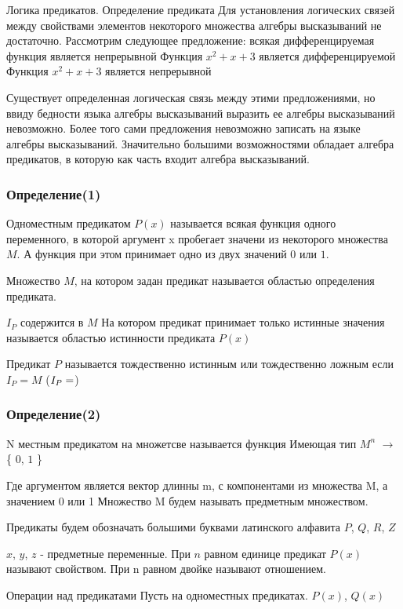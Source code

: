 Логика предикатов.
Определение предиката
Для установления логических связей между свойствами элементов некоторого множества алгебры высказываний не достаточно.
Рассмотрим следующее предложение: всякая дифференцируемая функция является непрерывной
Функция $x^2 + x + 3$ является дифференцируемой
Функция $x^2 +x + 3$ является непрерывной

Существует определенная логическая связь между этими предложениями, но ввиду бедности языка алгебры высказываний выразить ее алгебры высказываний невозможно. Более того сами предложения невозможно записать на языке алгебры высказываний. Значительно большими возможностями обладает алгебра предикатов, в которую как часть входит алгебра высказываний.

\subsubsection{Определение(1)}
Одноместным предикатом $P(x)$ называется всякая функция одного переменного, в которой аргумент x пробегает значени из некоторого множества $M$. А функция при этом принимает одно из двух значений $0$ или $1$.

Множество $M$, на котором задан предикат называется областью определения предиката.

$I_P$ содержится в $M$
На котором предикат принимает только истинные значения называется областью истинности предиката $P(x)$

Предикат $P$ называется тождественно истинным или тождественно ложным если $I_P = M$ ($I_P=\empty$)

\subsubsection{Определение(2)}

N местным предикатом на множетсве называется функция
Имеющая тип $M^n$ $\rightarrow$ \{ $0$, $1$ \}

Где аргументом является вектор длинны m, с компонентами из множества M, а значением 0 или 1
Множество M будем называть предметным множеством.

Предикаты будем обозначать большими буквами латинского алфавита
$P$, $Q$, $R$, $Z$

$x$, $y$, $z$ - предметные переменные.
При $n$ равном единице предикат $P(x)$ называют свойством.
При n равном двойке называют отношением.

Операции над предикатами
Пусть на одноместных предикатах. $P(x)$, $Q(x)$

